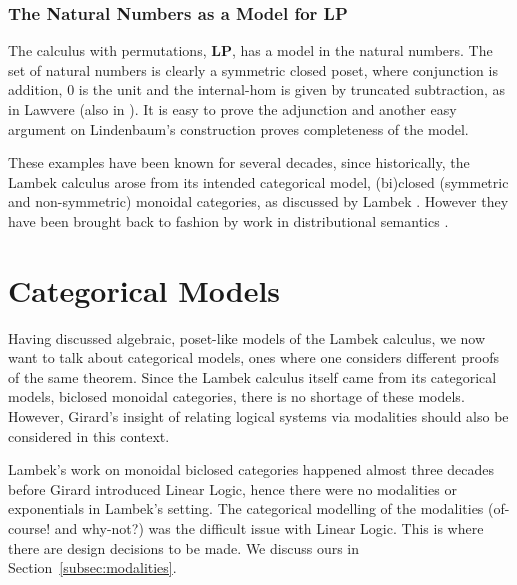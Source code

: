 \documentclass{lmcs}
\begin{document}
\subsubsection{The Natural Numbers as a Model for LP}
\label{subsec:the_set_of_natural_numbers}
The calculus with permutations, $\textbf{LP}$, has a model in the natural numbers.
The set of natural numbers is
clearly a symmetric closed poset, where conjunction is addition, $0$ is the unit and the
internal-hom is given by truncated subtraction, as in Lawvere \cite{lawvere1973} (also in  \cite{depaiva1991, Hyland:1991}).  It is easy
to prove the adjunction and another easy argument on Lindenbaum's construction  proves completeness of the model.

These examples have been known for several decades, since historically, the Lambek calculus arose from its intended categorical model, (bi)closed (symmetric and non-symmetric) monoidal categories, as discussed by Lambek \cite{lambek1988}. However they have been brought back to fashion by work in distributional semantics \cite{coecke2013}.


\section{Categorical Models}

Having discussed algebraic, poset-like models of the Lambek calculus,
we now want to talk about categorical models, ones where one considers
different proofs of the same theorem. Since the Lambek calculus itself
came from its categorical models, biclosed monoidal categories, there
is no shortage of these models. However, Girard's insight of relating
logical systems via modalities should also be considered in this
context.

Lambek's work on monoidal biclosed categories happened almost three
decades before Girard introduced Linear Logic, hence there were no
modalities or exponentials in Lambek's setting. The categorical
modelling of the modalities (of-course! and why-not?) was the
difficult issue with Linear Logic.
This is where there are design decisions to be made. We discuss ours
in Section~\ref{subsec:modalities}.
\end{document}
